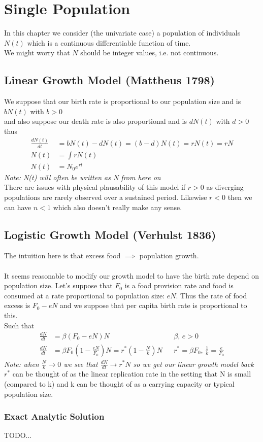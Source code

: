 \section{Single Population}
In this chapter we consider (the univariate case) a population of individuals $N(t)$ which is a continuous differentiable function of time.\\
We might worry that $N$ should be integer values, i.e. not continuous.
\subsection{Linear Growth Model (Mattheus 1798)}
We suppose that our birth rate is proportional to our population size and is $bN(t)$ with $b > 0$\\
and also suppose our death rate is also proportional and is $dN(t)$ with $d > 0$\\
thus
\begin{align*}
  \frac{dN(t)}{dt} &= bN(t) - dN(t) = (b-d)N(t) = rN(t) = rN \\
  N(t) &= \int rN(t)\\
  N(t) &= N_{0}e^{rt}
\end{align*}
\textit{Note: N(t) will often be written as N from here on}\\

There are issues with physical plausability of this model if $r > 0$ as diverging populations are rarely observed over a sustained period. Likewise $r < 0$ then we can have $n < 1$ which also doesn't really make any sense.

\subsection{Logistic Growth Model (Verhulst 1836)}
The intuition here is that excess food $\implies$ population growth. \\
\\
It seems reasonable to modify our growth model to have the birth rate depend on population size. Let's suppose that $F_{0}$ is a food provision rate and food is consumed at a rate proportional to population size: $eN$.
Thus the rate of food excess is $F_{0} - eN$ and we suppose that per capita birth rate is proportional to this. \\
Such that
\begin{align*}
  \frac{dN}{dt} &= \beta(F_{0} - eN)N && \beta\text{, }e > 0 \\
  \frac{dN}{dt} &= \beta F_{0}(1 - \frac{eN}{F_{0}})N = r^{*}(1 - \frac{N}{k})N &&r^{*} = \beta F_{0}\text{, }\frac{1}{k} = \frac{e}{F_{0}}
\end{align*}
\textit{Note: when $\frac{N}{k} \to 0$ we see that $\frac{dN}{dt} \to r^{*}N$ so we get our linear growth model back}\\

$r^{*}$ can be thought of as the linear replication rate in the setting that N is small (compared to k) and k can be thought of as a carrying capacity or typical population size.

\subsubsection*{Exact Analytic Solution}
TODO...
